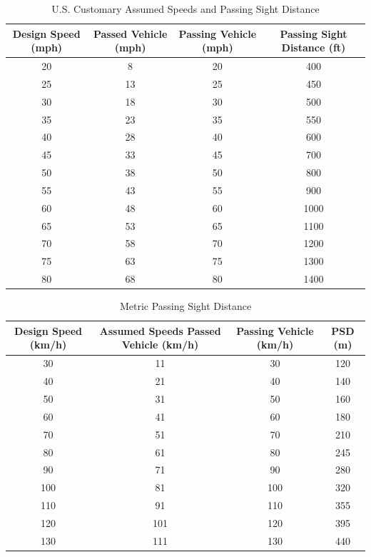 \documentclass{article}
\begin{document}
  \begin{table}
  \centering
  \caption{U.S. Customary Assumed Speeds and Passing Sight Distance}
  \label{tab:us_customary_speeds}
  \begin{tabular}{cccc}
  \toprule
  Design Speed (mph) & Passed Vehicle (mph) & Passing Vehicle (mph) & Passing Sight Distance (ft) \\
  \midrule
  20 & 8  & 20 & 400 \\
  25 & 13 & 25 & 450 \\
  30 & 18 & 30 & 500 \\
  35 & 23 & 35 & 550 \\
  40 & 28 & 40 & 600 \\
  45 & 33 & 45 & 700 \\
  50 & 38 & 50 & 800 \\
  55 & 43 & 55 & 900 \\
  60 & 48 & 60 & 1000 \\
  65 & 53 & 65 & 1100 \\
  70 & 58 & 70 & 1200 \\
  75 & 63 & 75 & 1300 \\
  80 & 68 & 80 & 1400 \\
  \bottomrule
  \end{tabular}
  \end{table}
  
  \begin{table}[h!]
  \centering
  \caption{Metric Passing Sight Distance}
  \label{tab:metric_passing_sight_distance}
  \begin{tabular}{cccc}
  \toprule
  Design Speed (km/h) & Assumed Speeds Passed Vehicle (km/h) & Passing Vehicle (km/h) & PSD (m) \\
  \midrule
  30 & 11 & 30 & 120 \\
  40 & 21 & 40 & 140 \\
  50 & 31 & 50 & 160 \\
  60 & 41 & 60 & 180 \\
  70 & 51 & 70 & 210 \\
  80 & 61 & 80 & 245 \\
  90 & 71 & 90 & 280 \\
  100 & 81 & 100 & 320 \\
  110 & 91 & 110 & 355 \\
  120 & 101 & 120 & 395 \\
  130 & 111 & 130 & 440 \\
  \bottomrule
  \end{tabular}
  \end{table}
  
\end{document}
